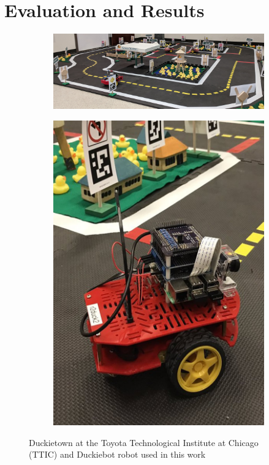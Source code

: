 \section{Evaluation and Results}

\begin{figure}
	\begin{subfigure}{0.78\textwidth}
		\centering
		\includegraphics[width=\textwidth]{figures/duckietown.jpg}
	    \vspace{-12pt}
	    \caption{\label{fig:duckietown}}
	\end{subfigure}
	\begin{subfigure}{0.193\textwidth}
		\centering
		\includegraphics[width=\textwidth]{figures/duckiebot.jpg}
		\caption{\label{fig:duckiebot}}
	\end{subfigure}
	\caption{Duckietown at the Toyota Technological Institute at Chicago (TTIC) and Duckiebot robot used in this work}
	\label{fig:test-bed}
\end{figure}

